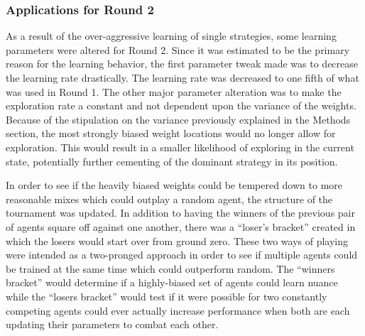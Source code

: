 




\subsubsection{Applications for Round 2}



As a result of the over-aggressive learning of single strategies,
some learning parameters were altered for Round 2.
%
Since it was estimated to be the primary reason for the learning behavior,
the first parameter tweak made was to decrease the learning rate drastically.
%
The learning rate was decreased to one fifth of what was used in Round 1.
%
The other major parameter alteration was to make the exploration rate a constant
and not dependent upon the variance of the weights.
%
Because of the stipulation on the variance previously explained in the Methods
section,
the most strongly biased weight locations would no longer allow for exploration.
%
This would result in a smaller likelihood of exploring in the current state,
potentially further cementing of the dominant strategy in its position.


In order to see if the heavily biased weights could be tempered down to more
reasonable mixes which could outplay a random agent,
the structure of the tournament was updated.
%
In addition to having the winners of the previous pair of agents square
off against one another,
there was a ``loser's bracket'' created
in which the losers would start over from ground zero.
%
These two ways of playing were intended as a two-pronged approach
in order to see if multiple agents could be trained at the same time
which could outperform random.
%
The ``winners bracket'' would determine if a highly-biased set of agents could
learn nuance
while the ``losers bracket'' would test if it were possible for two constantly
competing agents could ever actually increase performance when both are each
updating their parameters to combat each other.


